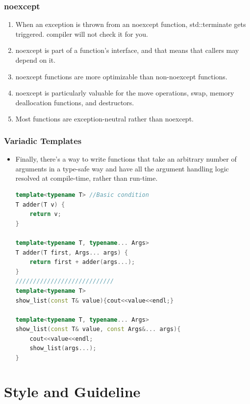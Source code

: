 \documentclass[a4paper,11pt,twoside]{book}
\begin{document}
\subsection{noexcept}

\begin{enumerate}

\item  When an exception is thrown from an noexcept function, std::terminate gets triggered. compiler will not check it for you.

\item noexcept is part of a function's interface, and that means that callers may
depend on it.

\item noexcept functions are more optimizable than non-noexcept functions.

\item noexcept is particularly valuable for the move operations, swap, memory deallocation functions, and destructors.

\item Most functions are exception-neutral rather than noexcept.

\end{enumerate}

\subsection{Variadic Templates}
\begin{itemize}
\item Finally, there's a way to write functions that take an arbitrary number of arguments in a type-safe way and have all the argument handling logic resolved at compile-time, rather than run-time.

\begin{lstlisting}[frame=single, language=c++]
template<typename T> //Basic condition
T adder(T v) {
	return v;
}

template<typename T, typename... Args>
T adder(T first, Args... args) {
	return first + adder(args...);
}
////////////////////////////
template<typename T>
show_list(const T& value){cout<<value<<endl;}

template<typename T, typename... Args>
show_list(const T& value, const Args&... args){
	cout<<value<<endl;
	show_list(args...);
}
\end{lstlisting}
\end{itemize}

\chapter{Style and Guideline}
\end{document}
